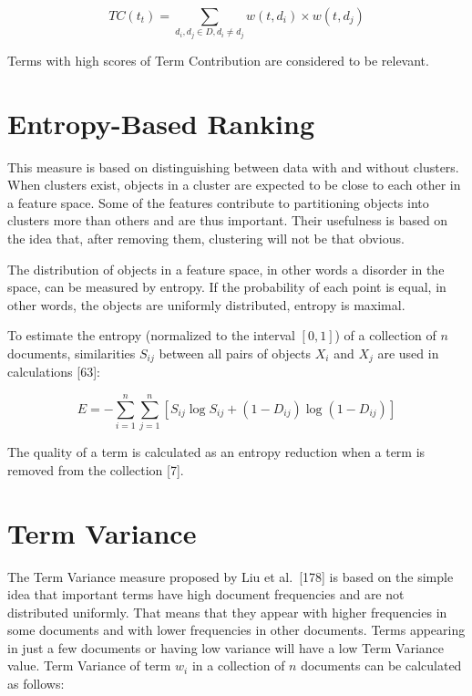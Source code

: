 \documentclass[11pt,openany,executivepaper]{book}
\begin{document}
\begin{equation}
    TC(t_t) = \sum_{d_i, d_j \in D, d_i \ne d_j} w(t, d_i) \times w(t, d_j)
\end{equation}

Terms with high scores of Term Contribution are considered to be relevant.

\section{Entropy-Based Ranking}

This measure is based on distinguishing between data with and without clusters. When clusters exist, objects in a cluster are expected to be close to each other in a feature space. Some of the features contribute to partitioning objects into clusters more than others and are thus important. Their usefulness is based on the idea that, after removing them, clustering will not be that obvious.

The distribution of objects in a feature space, in other words a disorder in the space, can be measured by entropy. If the probability of each point is equal, in other words, the objects are uniformly distributed, entropy is maximal.

To estimate the entropy (normalized to the interval $[0, 1]$) of a collection of $n$ documents, similarities $S_{ij}$ between all pairs of objects $X_i$ and $X_j$ are used in calculations [63]:

\begin{equation}
    E = - \sum_{i=1}^{n} \sum_{j=1}^{n} [S_{ij} \log S_{ij} + (1 - D_{ij})\log(1 - D_{ij})]
\end{equation}

The quality of a term is calculated as an entropy reduction when a term is removed from the collection [7].

\section{Term Variance}

The Term Variance measure proposed by Liu et al.\ [178] is based on the simple idea that important terms have high document frequencies and are not distributed uniformly. That means that they appear with higher frequencies in some documents and with lower frequencies in other documents. Terms appearing in just a few documents or having low variance will have a low Term Variance value. Term Variance of term $w_i$ in a collection of $n$ documents can be calculated as follows:
\end{document}
